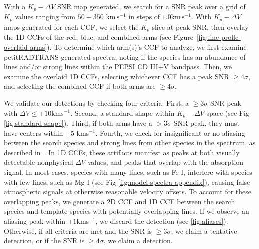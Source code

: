 \documentclass[twocolumn]{aastex631}
\begin{document}
            With a ${K_p-\Delta\!V}$ SNR map generated, we search for a SNR peak over a grid of $K_p$ values ranging from $50-350$ $\text{km}\,\text{s}^{-1}$ in steps of $1.0 \text{km}\,\text{s}^{-1}$. With $K_p-\Delta V$ maps generated for each CCF, we select the $K_p$ slice at peak SNR, then overlay the 1D CCFs of the red, blue, and combined arms (see Figure~\ref{fig:line-profle-overlaid-arms}). To determine which arm(s)'s CCF to analyze, we first examine petitRADTRANS generated spectra, noting if the species has an abundance of lines and/or strong lines within the PEPSI CD III+V bandpass. Then, we examine the overlaid 1D CCFs, selecting whichever CCF has a peak SNR $\geq4\sigma$, and selecting the combined CCF if both arms are $\geq4\sigma$.
                        
            We validate our detections by checking four criteria: First, a $\geq{3\sigma}$ SNR peak with $\Delta V \leq \pm10$kms$^{-1}$. Second, a standard shape within ${K_p-\Delta V}$ space (see Fig \ref{fig:standard-shape}). Third, if both arms have a $>{3\sigma}$ SNR peak, they must have centers within $\pm 5$ kms$^{-1}$. Fourth, we check for insignificant or no aliasing between the search species and strong lines from other species in the spectrum, as described in~\citet{Borsato2023, Petz2023}. In 1D CCFs, these artifacts manifest as peaks at both visually detectable nonphysical $\Delta V$ values, and peaks that overlap with the absorption signal. In most cases, species with many lines, such as Fe I, interfere with species with few lines, such as Mg I (see Fig \ref{fig:model-spectra-appendix}), causing false atmospheric signals at otherwise reasonable velocity offsets. To account for these overlapping peaks, we generate a 2D CCF and 1D CCF between the search species and template species with potentially overlapping lines. If we observe an aliasing peak within $\pm1$kms$^{-1}$, we discard the detection (see \ref{fig:aliases}). Otherwise, if all criteria are met and the SNR is $\geq3\sigma$, we claim a tentative detection, or if the SNR is $\geq4\sigma$, we claim a detection.
\end{document}
